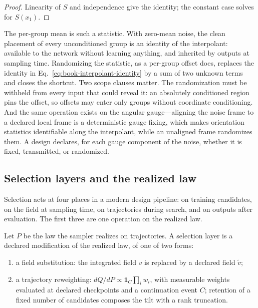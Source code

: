 \begin{proof}
Linearity of $S$ and independence give the identity; the constant case solves for $S(x_1)$.
\end{proof}

The per-group mean is such a statistic.  With zero-mean noise, the clean placement of every
unconditioned group is an identity of the interpolant: available to the network without learning
anything, and inherited by outputs at sampling time.  Randomizing the statistic, as a per-group
offset does, replaces the identity in Eq.~\ref{eq:book-interpolant-identity} by a sum of two
unknown terms and closes the shortcut.  Two scope clauses matter.  The randomization must be
withheld from every input that could reveal it: an absolutely conditioned region pins the offset,
so offsets may enter only groups without coordinate conditioning.  And the same operation exists
on the angular gauge---aligning the noise frame to a declared local frame is a deterministic
gauge fixing, which makes orientation statistics identifiable along the interpolant, while an
unaligned frame randomizes them.  A design declares, for each gauge component of the noise,
whether it is fixed, transmitted, or randomized.

\subsection{Selection layers and the realized law}
\label{subsec:selection-layers}

Selection acts at four places in a modern design pipeline: on training candidates, on the field
at sampling time, on trajectories during search, and on outputs after evaluation.  The first
three are one operation on the realized law.

\begin{definition}
\label{def:selection-layer}
Let $P$ be the law the sampler realizes on trajectories.  A selection layer is a declared
modification of the realized law, of one of two forms:
\begin{enumerate}
\item a field substitution: the integrated field $v$ is replaced by a declared field $\tilde v$;
\item a trajectory reweighting: $dQ/dP\propto\mathbf 1_C\prod_iw_i$, with measurable weights
evaluated at declared checkpoints and a continuation event $C$; retention of a fixed number of
candidates composes the tilt with a rank truncation.
\end{enumerate}
\end{definition}

